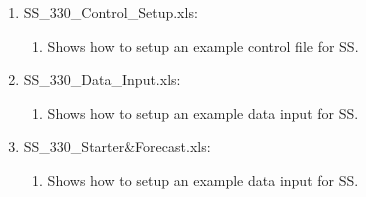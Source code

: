 \begin{enumerate}
		\item SS\_330\_Control\_Setup.xls:
		\begin{enumerate}
			\item Shows how to setup an example control file for SS.
		\end{enumerate}
		\item SS\_330\_Data\_Input.xls:
		\begin{enumerate}
			\item Shows how to setup an example data input for SS.
		\end{enumerate}
		\item SS\_330\_Starter\&Forecast.xls:
		\begin{enumerate}
			\item Shows how to setup an example data input for SS.
		\end{enumerate}
	\end{enumerate}
		
